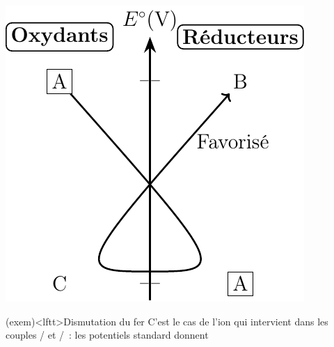 \documentclass[../../main/main.tex]{subfiles}
\begin{document}
\begin{tcb*}[sidebyside, righthand ratio=.3]
\begin{center}
{			\includegraphics[width=\linewidth]{estand_dismut}
		}
	\end{center}
\end{tcb*}

\begin{tcb*}(exem)<lftt>{Dismutation du fer}
	C'est le cas de l'ion  qui intervient dans les couples
	/ et /~: les potentiels standard
	donnent
	\psw{
	\[
		\ce{2 {Fe}^2+_{\rm(aq)} + Fe_{\rm(s)} = 3 {Fe}^2+_{\rm(aq)}}
	\]
	}
	\vspace{-15pt}
\end{tcb*}
\end{document}
